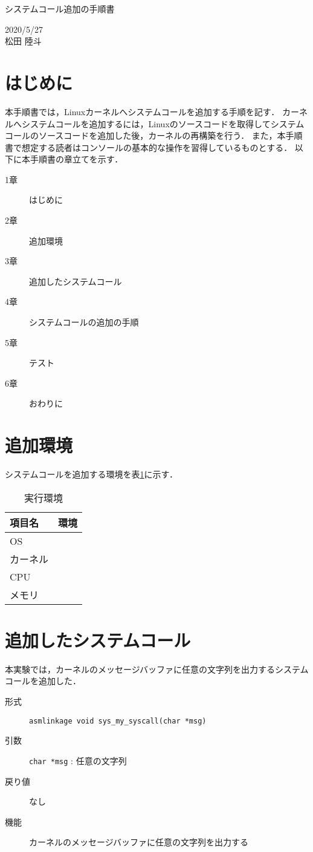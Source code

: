 \documentclass[12pt]{jsarticle}
\begin{document}
\begin{center}
{\LARGE システムコール追加の手順書}
\end{center}

\begin{flushright}
  2020/5/27\\
  松田 陸斗
\end{flushright}
\section{はじめに}
\label{sec:introduction}
本手順書では，Linuxカーネルへシステムコールを追加する手順を記す．
カーネルへシステムコールを追加するには，Linuxのソースコードを取得してシステムコールのソースコードを追加した後，カーネルの再構築を行う．
また，本手順書で想定する読者はコンソールの基本的な操作を習得しているものとする．
以下に本手順書の章立てを示す．
\begin{description}
\item[1章] はじめに
\item[2章] 追加環境
\item[3章] 追加したシステムコール
\item[4章] システムコールの追加の手順
\item[5章] テスト
\item[6章] おわりに
\end{description}

\section{追加環境}
システムコールを追加する環境を表\ref{env}に示す．

\begin{table}[h]
\begin{center}
	\caption{実行環境}\label{env}
	\begin{tabular}{l|l}
	\hline\hline
	\multicolumn{1}{l|}{項目名} & \multicolumn{1}{l}{環境}\\
	\hline
	OS & \\
	カーネル & \\
	CPU & \\
	メモリ & \\
	\hline
	\end{tabular}
\end{center}
\end{table}
\section{追加したシステムコール}
本実験では，カーネルのメッセージバッファに任意の文字列を出力するシステムコールを追加した．
\begin{description}
	\item[形式] \verb|asmlinkage void sys_my_syscall(char *msg)|
	\item[引数] \verb|char *msg| : 任意の文字列
	\item[戻り値] なし
	\item[機能] カーネルのメッセージバッファに任意の文字列を出力する
\end{description}
\end{document}
